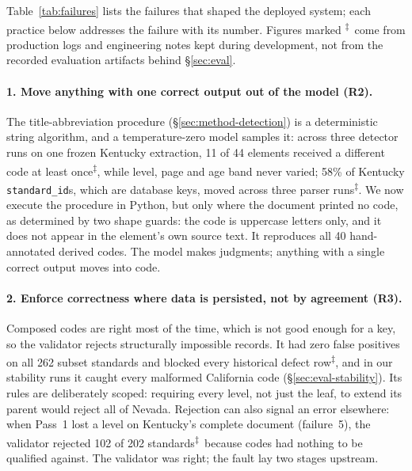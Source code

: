 \documentclass[letterpaper]{article} %
\newcommand{\elog}{\textsuperscript{$\ddagger$}}
\begin{document}
Table~\ref{tab:failures} lists the failures that shaped the deployed system;
each practice below addresses the failure with its number. Figures marked
\elog\ come from production logs and engineering notes kept during
development, not from the recorded evaluation artifacts behind
\S\ref{sec:eval}.

\paragraph{1. Move anything with one correct output out of the model (R2).}
The title-abbreviation procedure (\S\ref{sec:method-detection}) is a
deterministic string algorithm, and a temperature-zero model samples it: across
three detector runs on one frozen Kentucky extraction, 11 of 44 elements
received a different code at least once\elog, while level, page and age band
never varied; 58\% of Kentucky \texttt{standard\_id}s, which are database keys,
moved across three parser runs\elog. We now execute the procedure in Python,
but only where the document printed no code, as determined by two shape
guards: the code is uppercase letters only, and it does not appear in the
element's own source text. It reproduces all 40 hand-annotated derived codes.
The model makes judgments; anything with a single correct output moves into
code.

\paragraph{2. Enforce correctness where data is persisted, not by agreement
(R3).} Composed codes are right most of the time, which is not good enough for
a key, so the validator rejects structurally impossible records. It had zero
false positives on all 262 subset standards and blocked every historical defect
row\elog, and in our stability runs it caught every malformed California code
(\S\ref{sec:eval-stability}). Its rules are deliberately scoped: requiring
every level, not just the leaf, to extend its parent would reject all of
Nevada. Rejection can also signal an error elsewhere: when Pass~1 lost a level
on Kentucky's complete document (failure~5), the validator rejected 102 of 202
standards\elog\ because codes had nothing to be qualified against. The
validator was right; the fault lay two stages upstream.
\end{document}

